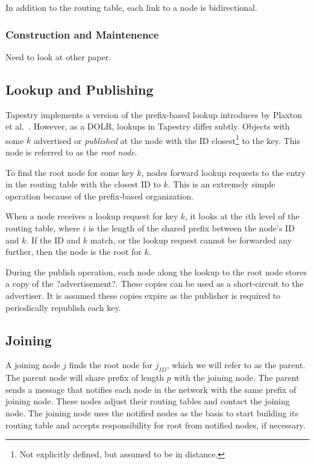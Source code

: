 \documentclass[10pt,letterpaper]{report}
\begin{document}
In addition to the routing table, each link to a node is bidirectional.


\subsubsection*{Construction and Maintenence}
Need to look at other paper.

\subsection*{Lookup and Publishing}
Tapestry \cite{tapestry} implements a version of the prefix-based lookup introduces by Plaxton et al.\ \cite{prr}. 
However, as a DOLR, lookups in Tapestry differ subtly.
Objects with some $k$ advertised or \textit{published} at the node with the ID closest\footnote{Not explicitly defined, but assumed to be in distance.} to the key.
This node is referred to as the \textit{root node}.

To find the root node for some key $k$, nodes forward lookup requests to the entry in the routing table with the closest ID to $k$. 
This is an extremely simple operation because of the prefix-based organization.

When a node receives a lookup request for key $k$, it looks at the $i$th level of the routing table, where $i$ is the length of the shared prefix between the node's ID and $k$.
If the ID and $k$ match, or the lookup request cannot be forwarded any further, then the node is the root for $k$.

During the publish operation, each node along the lookup to the root node stores a copy of the ?advertisement?. 
These copies can be used as a short-circuit to the advertiser.
It is assumed these copies expire as the publisher is required to periodically republish each key.



\subsection*{Joining}

A joining node $j$ finds the root node for $j_{ID}$, which we will refer to as the parent.
The parent node will share prefix of length $p$ with the joining node.
The parent sends a message  that notifies each node in the network with the same prefix of joining node.
These nodes adjust their routing tables and contact the joining node.
The joining node uses the notified nodes as the basis to start building its routing table and accepts responsibility for root from notified nodes, if necessary.
\end{document}
